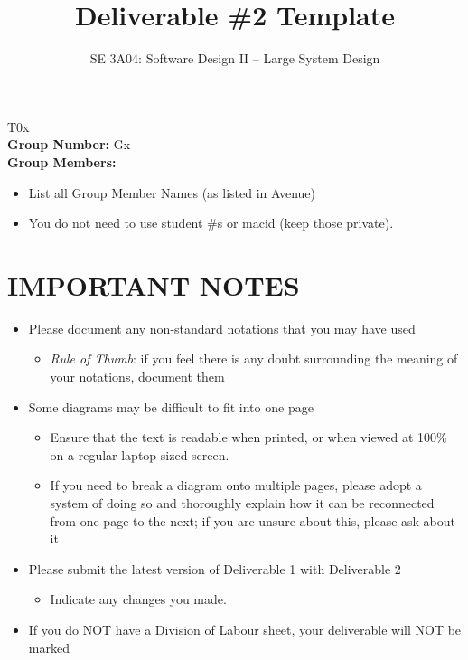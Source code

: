 \documentclass[]{article}
\title{Deliverable \#2 Template}
\author{SE 3A04: Software Design II -- Large System Design}
\date{}
\begin{document}
\maketitle
{} T0x\\
{\bf Group Number:} Gx \\
{\bf Group Members:}
\begin{itemize}
	\item List all Group Member Names (as listed in Avenue)
	\item You do not need to use student \#s or macid (keep those private).
\end{itemize}

\section*{IMPORTANT NOTES}
\begin{itemize}
	\item Please document any non-standard notations that you may have used
	      \begin{itemize}
		      \item \emph{Rule of Thumb}: if you feel there is any doubt surrounding the meaning of your notations, document them
	      \end{itemize}
	\item Some diagrams may be difficult to fit into one page
	      \begin{itemize}
		      \item Ensure that the text is readable when printed, or when viewed at 100\% on a regular laptop-sized screen.
		      \item If you need to break a diagram onto multiple pages, please adopt a system of doing so and thoroughly explain how it can be reconnected from one page to the next; if you are unsure about this, please ask about it
	      \end{itemize}
	\item Please submit the latest version of Deliverable 1 with Deliverable 2
	      \begin{itemize}
		      \item Indicate any changes you made.
	      \end{itemize}
	\item If you do \underline{NOT} have a Division of Labour sheet, your deliverable will \underline{NOT} be marked
\end{itemize}
\end{document}
